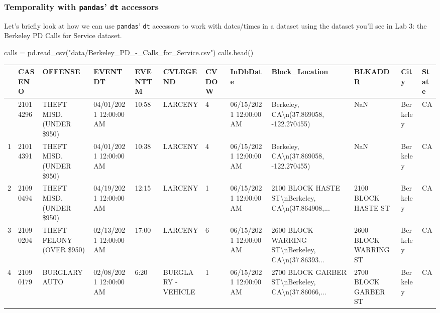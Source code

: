 \documentclass[
  letterpaper,
  DIV=11,
  numbers=noendperiod]{scrreprt}
\newenvironment{Shaded}{\begin{snugshade}}{\end{snugshade}}
\newcommand{\NormalTok}[1]{\textcolor[rgb]{0.00,0.23,0.31}{#1}}
\newcommand{\OperatorTok}[1]{\textcolor[rgb]{0.37,0.37,0.37}{#1}}
\newcommand{\StringTok}[1]{\textcolor[rgb]{0.13,0.47,0.30}{#1}}
\begin{document}
\subsubsection{\texorpdfstring{Temporality with \texttt{pandas}'
\texttt{dt}
accessors}{Temporality with pandas' dt accessors}}\label{temporality-with-pandas-dt-accessors}

Let's briefly look at how we can use \texttt{pandas}' \texttt{dt}
accessors to work with dates/times in a dataset using the dataset you'll
see in Lab 3: the Berkeley PD Calls for Service dataset.

\begin{Shaded}
\begin{Highlighting}[]
\NormalTok{calls }\OperatorTok{=}\NormalTok{ pd.read\_csv(}\StringTok{"data/Berkeley\_PD\_{-}\_Calls\_for\_Service.csv"}\NormalTok{)}
\NormalTok{calls.head()}
\end{Highlighting}
\end{Shaded}

\begin{longtable}[]{@{}llllllllllll@{}}
\toprule\noalign{}
& CASENO & OFFENSE & EVENTDT & EVENTTM & CVLEGEND & CVDOW & InDbDate &
Block\_Location & BLKADDR & City & State \\
\midrule\noalign{}
\endhead
\bottomrule\noalign{}
\endlastfoot
0 & 21014296 & THEFT MISD. (UNDER \$950) & 04/01/2021 12:00:00 AM &
10:58 & LARCENY & 4 & 06/15/2021 12:00:00 AM & Berkeley,
CA\textbackslash n(37.869058, -122.270455) & NaN & Berkeley & CA \\
1 & 21014391 & THEFT MISD. (UNDER \$950) & 04/01/2021 12:00:00 AM &
10:38 & LARCENY & 4 & 06/15/2021 12:00:00 AM & Berkeley,
CA\textbackslash n(37.869058, -122.270455) & NaN & Berkeley & CA \\
2 & 21090494 & THEFT MISD. (UNDER \$950) & 04/19/2021 12:00:00 AM &
12:15 & LARCENY & 1 & 06/15/2021 12:00:00 AM & 2100 BLOCK HASTE
ST\textbackslash nBerkeley, CA\textbackslash n(37.864908,... & 2100
BLOCK HASTE ST & Berkeley & CA \\
3 & 21090204 & THEFT FELONY (OVER \$950) & 02/13/2021 12:00:00 AM &
17:00 & LARCENY & 6 & 06/15/2021 12:00:00 AM & 2600 BLOCK WARRING
ST\textbackslash nBerkeley, CA\textbackslash n(37.86393... & 2600 BLOCK
WARRING ST & Berkeley & CA \\
4 & 21090179 & BURGLARY AUTO & 02/08/2021 12:00:00 AM & 6:20 & BURGLARY
- VEHICLE & 1 & 06/15/2021 12:00:00 AM & 2700 BLOCK GARBER
ST\textbackslash nBerkeley, CA\textbackslash n(37.86066,... & 2700 BLOCK
GARBER ST & Berkeley & CA \\
\end{longtable}
\end{document}
